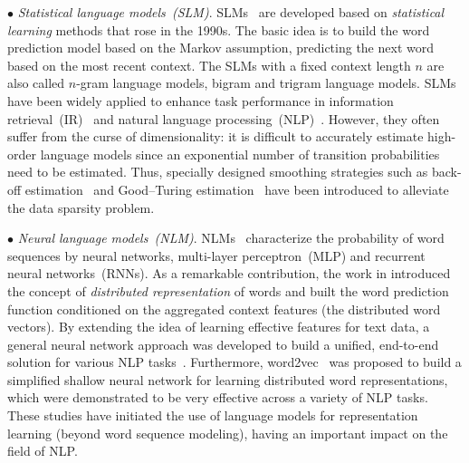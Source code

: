 $\bullet$ \emph{Statistical language models~(SLM)}.  SLMs~\cite{NLP-speech-book,SLM-2004,rosenfeld2000two,stolcke2002srilm} are developed based on  \emph{statistical learning} methods that rose in the 1990s. The basic idea is to build the word prediction model based on the Markov assumption, \eg predicting the next word based on the most recent context. The SLMs with a fixed context length $n$ are also called $n$-gram language models, \eg   bigram and trigram language models. SLMs have been widely applied to enhance task performance in information retrieval~(IR)~\cite{SLM-IR1,SLM-IR2} and natural language processing~(NLP)~\cite{Thede-acl-1999-a,bahl1989tree,Brants-emnlp-2007-large}.  
However, they often suffer from the curse of dimensionality: it is difficult to accurately estimate high-order language models since an exponential number of transition probabilities need to be  estimated.
{Thus}, specially designed smoothing strategies  such as back-off estimation~\cite{Katz-IEEE-1987-estimation} and Good–Turing estimation~\cite{Gale-JQL-1995-good} have been introduced {to alleviate the data sparsity problem. }


$\bullet$ \emph{Neural language models~(NLM)}. NLMs~\cite{Bengio-JMLR-2003-A,Mikolov-INTERSPEECH-2010,Kombrink-INTERSPEECH-2011} characterize the probability of  word sequences by neural networks, \eg multi-layer perceptron~(MLP) and recurrent neural networks~(RNNs).   
As a remarkable contribution, the work in \cite{Bengio-JMLR-2003-A} introduced the concept of \emph{distributed representation} of words and built the word prediction function conditioned on the aggregated context features (\ie the distributed word vectors).  
By extending the idea of learning effective features for text data, a general neural network approach was developed to build a unified, end-to-end  solution for various NLP tasks~\cite{Collobert-JMLR-2011}. Furthermore, word2vec~\cite{Mikolov-NIPS-2013,Mikolov-ICLR-2013} was proposed to build a simplified shallow neural network for learning distributed word representations, which were demonstrated to be very effective across a variety of NLP tasks. 
These studies have initiated the use of language models for representation learning (beyond word sequence modeling),  having  an important impact on the field of NLP.  
 

 

